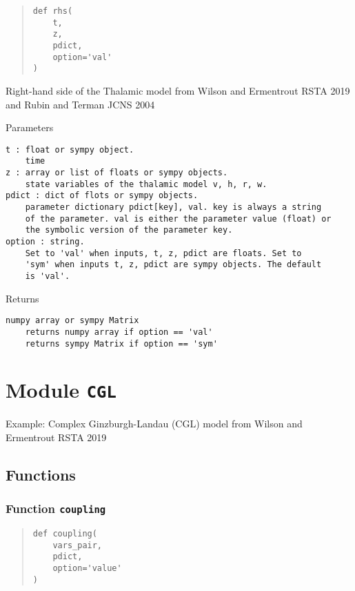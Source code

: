 \documentclass[english,a4paper,oneside]{article}
\begin{document}
\begin{quote}
\begin{verbatim}
def rhs(
    t,
    z,
    pdict,
    option='val'
)
\end{verbatim}
\end{quote}

Right-hand side of the Thalamic model from Wilson and Ermentrout RSTA
2019 and Rubin and Terman JCNS 2004

Parameters

\begin{verbatim}
t : float or sympy object.
    time
z : array or list of floats or sympy objects.
    state variables of the thalamic model v, h, r, w.
pdict : dict of flots or sympy objects.
    parameter dictionary pdict[key], val. key is always a string
    of the parameter. val is either the parameter value (float) or 
    the symbolic version of the parameter key.
option : string.
    Set to 'val' when inputs, t, z, pdict are floats. Set to
    'sym' when inputs t, z, pdict are sympy objects. The default
    is 'val'.
\end{verbatim}

Returns

\begin{verbatim}
numpy array or sympy Matrix
    returns numpy array if option == 'val'
    returns sympy Matrix if option == 'sym'
\end{verbatim}

\section{\texorpdfstring{Module \texttt{CGL}}{Module CGL}}\label{CGL}

Example: Complex Ginzburgh-Landau (CGL) model from Wilson and Ermentrout
RSTA 2019

\subsection{Functions}\label{functions-2}

\subsubsection{\texorpdfstring{Function
\texttt{coupling}}{Function coupling}}\label{CGL.coupling}

\begin{quote}
\begin{verbatim}
def coupling(
    vars_pair,
    pdict,
    option='value'
)
\end{verbatim}
\end{quote}
\end{document}
